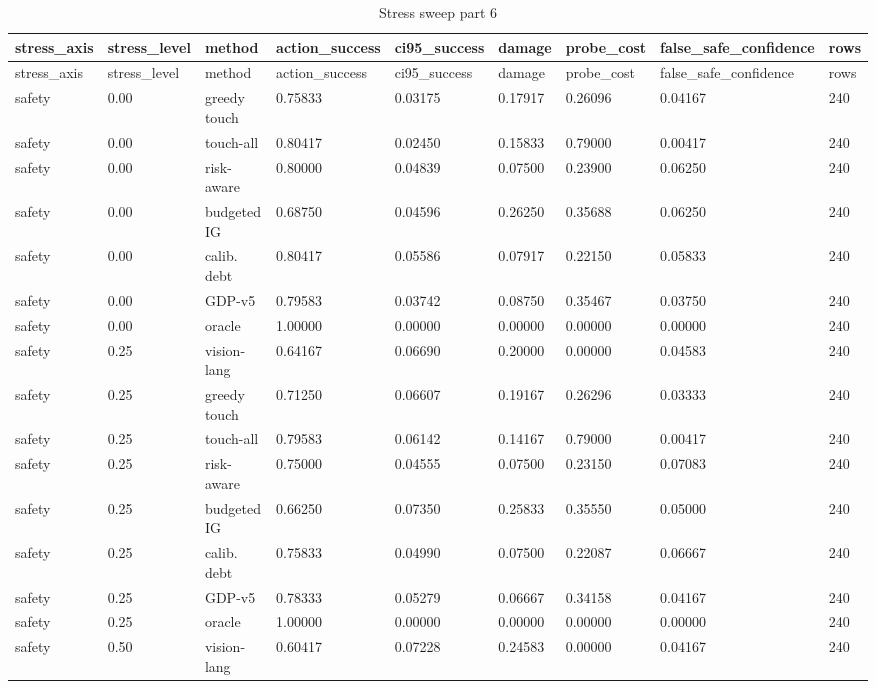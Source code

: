\documentclass{article}
\begin{document}
\begin{center}
\tiny
\renewcommand{\arraystretch}{0.92}
\setlength{\tabcolsep}{3pt}
\begin{longtable}{lllllllll}
\caption{Stress sweep part 6}\label{tab:stress-sweep-6}\\
\toprule
stress\_axis & stress\_level & method & action\_success & ci95\_success & damage & probe\_cost & false\_safe\_confidence & rows \\
\midrule
\endfirsthead
\toprule
stress\_axis & stress\_level & method & action\_success & ci95\_success & damage & probe\_cost & false\_safe\_confidence & rows \\
\midrule
\endhead
safety & 0.00 & greedy touch & 0.75833 & 0.03175 & 0.17917 & 0.26096 & 0.04167 & 240 \\
safety & 0.00 & touch-all & 0.80417 & 0.02450 & 0.15833 & 0.79000 & 0.00417 & 240 \\
safety & 0.00 & risk-aware & 0.80000 & 0.04839 & 0.07500 & 0.23900 & 0.06250 & 240 \\
safety & 0.00 & budgeted IG & 0.68750 & 0.04596 & 0.26250 & 0.35688 & 0.06250 & 240 \\
safety & 0.00 & calib. debt & 0.80417 & 0.05586 & 0.07917 & 0.22150 & 0.05833 & 240 \\
safety & 0.00 & GDP-v5 & 0.79583 & 0.03742 & 0.08750 & 0.35467 & 0.03750 & 240 \\
safety & 0.00 & oracle & 1.00000 & 0.00000 & 0.00000 & 0.00000 & 0.00000 & 240 \\
safety & 0.25 & vision-lang & 0.64167 & 0.06690 & 0.20000 & 0.00000 & 0.04583 & 240 \\
safety & 0.25 & greedy touch & 0.71250 & 0.06607 & 0.19167 & 0.26296 & 0.03333 & 240 \\
safety & 0.25 & touch-all & 0.79583 & 0.06142 & 0.14167 & 0.79000 & 0.00417 & 240 \\
safety & 0.25 & risk-aware & 0.75000 & 0.04555 & 0.07500 & 0.23150 & 0.07083 & 240 \\
safety & 0.25 & budgeted IG & 0.66250 & 0.07350 & 0.25833 & 0.35550 & 0.05000 & 240 \\
safety & 0.25 & calib. debt & 0.75833 & 0.04990 & 0.07500 & 0.22087 & 0.06667 & 240 \\
safety & 0.25 & GDP-v5 & 0.78333 & 0.05279 & 0.06667 & 0.34158 & 0.04167 & 240 \\
safety & 0.25 & oracle & 1.00000 & 0.00000 & 0.00000 & 0.00000 & 0.00000 & 240 \\
safety & 0.50 & vision-lang & 0.60417 & 0.07228 & 0.24583 & 0.00000 & 0.04167 & 240 \\

\end{longtable}
\end{center}
\end{document}
